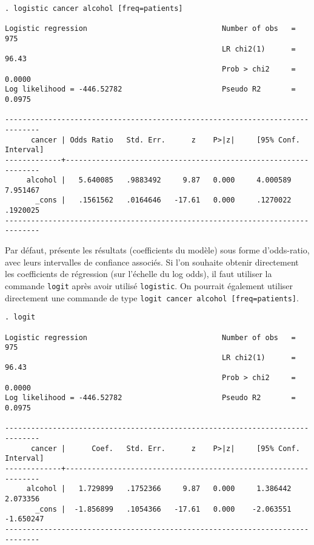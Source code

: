 \begin{verbatim}
. logistic cancer alcohol [freq=patients]

Logistic regression                               Number of obs   =        975
                                                  LR chi2(1)      =      96.43
                                                  Prob > chi2     =     0.0000
Log likelihood = -446.52782                       Pseudo R2       =     0.0975

------------------------------------------------------------------------------
      cancer | Odds Ratio   Std. Err.      z    P>|z|     [95% Conf. Interval]
-------------+----------------------------------------------------------------
     alcohol |   5.640085   .9883492     9.87   0.000     4.000589    7.951467
       _cons |   .1561562   .0164646   -17.61   0.000     .1270022    .1920025
------------------------------------------------------------------------------
\end{verbatim}

Par défaut, \Stata présente les résultats (coefficients du modèle) sous forme
d'odds-ratio, avec leurs intervalles de confiance associés. Si l'on souhaite
obtenir directement les coefficients de régression (sur l'échelle du log
odds), il faut utiliser la commande \texttt{logit} après avoir utilisé
\texttt{logistic}. On pourrait également utiliser directement une commande de
type \verb|logit cancer alcohol [freq=patients]|.
\begin{verbatim}
. logit

Logistic regression                               Number of obs   =        975
                                                  LR chi2(1)      =      96.43
                                                  Prob > chi2     =     0.0000
Log likelihood = -446.52782                       Pseudo R2       =     0.0975

------------------------------------------------------------------------------
      cancer |      Coef.   Std. Err.      z    P>|z|     [95% Conf. Interval]
-------------+----------------------------------------------------------------
     alcohol |   1.729899   .1752366     9.87   0.000     1.386442    2.073356
       _cons |  -1.856899   .1054366   -17.61   0.000    -2.063551   -1.650247
------------------------------------------------------------------------------
\end{verbatim}
\label{stop:sol3stata}

